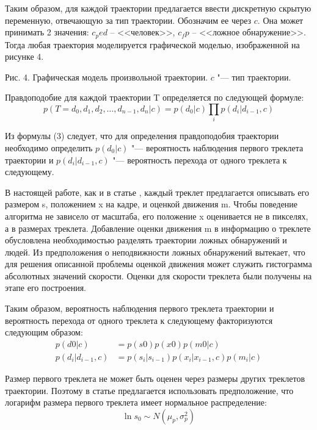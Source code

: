 Таким образом, для каждой траектории предлагается ввести дискретную скрытую переменную, отвечающую за тип траектории. Обозначим ее через $c$. Она может принимать 2 значения: $c_ped$ – <<человек>>, $c_fp$ – <<ложное обнаружение>>. Тогда любая траектория моделируется графической моделью, изображенной на рисунке 4.

Рис. 4. Графическая модель произвольной траектории. $c$ "--- тип траектории.

Правдоподобие для каждой траектории T определяется по следующей формуле:
\begin{equation}
	p(T={d_0, d_1, d_2, \dots, d_{n-1}, d_n}|c) = p(d_0|c)\prod_ip(d_i|d_{i-1}, c)
\end{equation}

Из формулы (3) следует, что для определения правдоподобия траектории необходимо определить $p(d_0 |c)$ "--- вероятность наблюдения первого треклета траектории и  $p(d_i|d_{i-1}, c)$ "--- вероятность перехода от одного треклета к следующему.

В настоящей работе, как и в статье \cite{benfold2011stable}, каждый треклет предлагается описывать его размером s, положением x на кадре, и оценкой движения m. Чтобы поведение алгоритма не зависело от масштаба, его положение x оценивается не в пикселях, а в размерах треклета. Добавление оценки движения m в информацию о треклете обусловлена необходимостью разделять траектории ложных обнаружений и людей. Из предположения о неподвижности ложных обнаружений вытекает, что для решения описанной проблемы оценкой движения может служить гистограмма абсолютных значений скорости. Оценки для скорости треклета были получены на этапе его построения.

Таким образом, вероятность наблюдения первого треклета траектории и вероятность перехода от одного треклета к следующему факторизуются следующим образом:
\begin{align}
	p(d 0 |c) &= p(s 0 )p(x 0 )p(m 0 |c) \\
	p(d_i|d_{i-1}, c) &= p(s_i | s_{i-1})p(x_i|x_{i-1}, c)p(m_i|c)
\end{align}

Размер первого треклета не может быть оценен через размеры других треклетов траектории. Поэтому в статье \cite{benfold2011stable} предлагается использовать предположение, что логарифм размера первого треклета имеет нормальное распределение:
\begin{equation}
	\ln s_0 \sim N(\mu_p, \sigma_p^2)
\end{equation}

